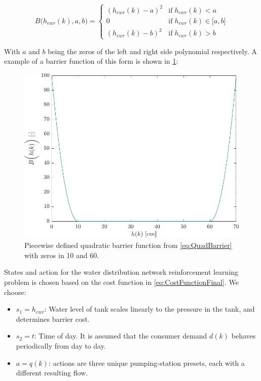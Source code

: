 \begin{equation}\label{eq:QuadBarrier}
	B\bigg(h_{ewr}(k),a,b\bigg)=\begin{cases}
		(h_{ewr}(k)-a)^{2} & \text{if} \; h_{ewr}(k) < a \\
		0 & \text{if} \; h_{ewr}(k)\in\big[a,b\big] \\
		(h_{ewr}(k)-b)^2 & \text{if} \; h_{ewr}(k) > b 
	\end{cases}
\end{equation}

With $ a $ and $ b $ being the zeros of the left and right side polynomial respectively. A example of a barrier function of this form is shown in  \cref{fig:QuadBarrierFunc1}:

\begin{figure}[h!]
	\centering
	\includegraphics[width=0.7\linewidth]{Figures/QuadBarrierFuncA10B60}
	\caption{Piecewise defined quadratic barrier function from \cref{eq:QuadBarrier} with zeros in 10 and 60.}
	\label{fig:QuadBarrierFunc1}
\end{figure} 

States and action for the water distribution network reinforcement learning problem is chosen based on the cost function in \cref{eq:CostFunctionFinal}. We choose:

\begin{itemize}
	\item $ s_{1}  = h_{ewr}$: Water level of tank scales linearly to the pressure in the tank, and determines barrier cost.
	
	\item $ s_{2} = t $: Time of day. It is assumed that the consumer demand $d(k)$ behaves periodically from day to day.
	
	\item $ a = q(k) $: actions are three unique pumping-station presets, each with a different resulting flow. 
\end{itemize}


